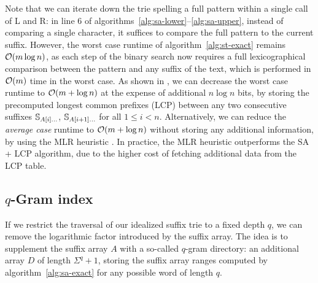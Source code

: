 Note that we can iterate down the trie spelling a full pattern within a single call of \textsc{L} and \textsc{R}: in line 6 of algorithms~\ref{alg:sa-lower}--\ref{alg:sa-upper}, instead of comparing a single character, it suffices to compare the full pattern to the current suffix.
However, the worst case runtime of algorithm~\ref{alg:st-exact} remains $\mathcal{O}(m \log{n})$, as each step of the binary search now requires a full lexicographical comparison between the pattern and any suffix of the text, which is performed in $\mathcal{O}(m)$ time in the worst case.
As shown in \citep{Manber1990}, we can decrease the worst case runtime to $\mathcal{O}(m + \log{n})$ at the expense of additional $n \log{n}$ bits, by storing the precomputed longest common prefixes (LCP) between any two consecutive suffixes $\mathbb {S}_{A[i] \dots}$, $\mathbb {S}_{A[i+1] \dots}$ for all $1 \leq i < n$.
Alternatively, we can reduce the \emph{average case} runtime to $\mathcal{O}(m + \log{n})$ without storing any additional information, by using the MLR heuristic \citep{Manber1990}.
In practice, the MLR heuristic outperforms the SA + LCP algorithm, due to the higher cost of fetching additional data from the LCP table.


\subsection{$q$-Gram index}

If we restrict the traversal of our idealized suffix trie to a fixed depth $q$, we can remove the logarithmic factor introduced by the suffix array.
The idea is to supplement the suffix array $A$ with a so-called $q$-gram directory: an additional array $D$ of length $\Sigma^q + 1$, storing the suffix array ranges computed by algorithm~\ref{alg:sa-exact} for any possible word of length $q$.

